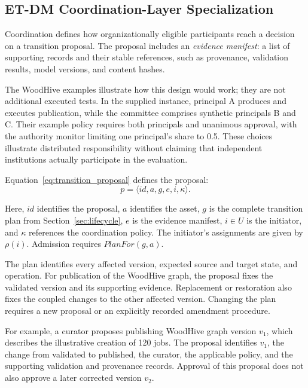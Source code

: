 \documentclass[journal]{IEEEtran}
\begin{document}
\subsection{ET-DM Coordination-Layer Specialization}
\label{sec:dao_decisions}

Coordination defines how organizationally eligible participants
reach a decision on a transition proposal. The proposal includes
an \emph{evidence manifest}: a list of supporting records and
their stable references, such as provenance, validation results,
model versions, and content hashes.

The WoodHive examples illustrate how this design would work; they are
not additional executed tests. In the supplied instance, principal A
produces and executes publication, while the committee comprises
synthetic principals B and C. Their example policy requires both
principals and unanimous approval, with the authority monitor limiting
one principal's share to 0.5. These choices illustrate distributed
responsibility without claiming that independent institutions actually
participate in the evaluation.

Equation~\ref{eq:transition_proposal} defines the proposal:
\begin{equation}
\label{eq:transition_proposal}
p=\langle id,a,g,e,i,\kappa\rangle.
\end{equation}

Here, $id$ identifies the proposal, $a$ identifies the asset,
$g$ is the complete transition plan from
Section~\ref{sec:lifecycle}, $e$ is the evidence manifest,
$i\in U$ is the initiator, and $\kappa$ references the
coordination policy. The initiator's assignments are given
by $\rho(i)$. Admission requires $PlanFor(g,a)$.

The plan identifies every affected version, expected source
and target state, and operation. For publication of the
WoodHive graph, the proposal fixes the validated version
and its supporting evidence. Replacement or restoration
also fixes the coupled changes to the other affected version.
Changing the plan requires a new proposal or an explicitly
recorded amendment procedure.

For example, a curator proposes publishing WoodHive graph version
$v_1$, which describes the illustrative creation of 120 jobs.
The proposal identifies $v_1$, the change from validated to published,
the curator, the applicable policy, and the supporting validation
and provenance records. Approval of this proposal does not also
approve a later corrected version $v_2$.
\end{document}
